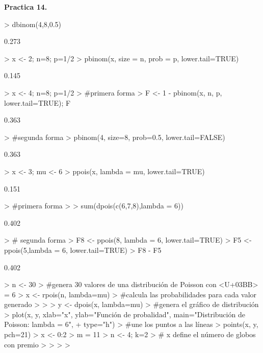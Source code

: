 \documentclass{article}
\begin{document}
\textbf{Practica 14.}

\begin{Schunk}
\begin{Sinput}
> dbinom(4,8,0.5)
\end{Sinput}
\begin{Soutput}
[1] 0.273
\end{Soutput}
\begin{Sinput}
> x <- 2; n=8; p=1/2
> pbinom(x, size = n, prob = p, lower.tail=TRUE)
\end{Sinput}
\begin{Soutput}
[1] 0.145
\end{Soutput}
\begin{Sinput}
> x <- 4; n=8; p=1/2
> #primera forma
> F <- 1 - pbinom(x, n, p, lower.tail=TRUE); F
\end{Sinput}
\begin{Soutput}
[1] 0.363
\end{Soutput}
\begin{Sinput}
> #segunda forma
> pbinom(4, size=8, prob=0.5, lower.tail=FALSE)
\end{Sinput}
\begin{Soutput}
[1] 0.363
\end{Soutput}
\begin{Sinput}
> x <- 3; mu <- 6
> ppois(x, lambda = mu, lower.tail=TRUE)
\end{Sinput}
\begin{Soutput}
[1] 0.151
\end{Soutput}
\begin{Sinput}
> #primera forma
> 
> sum(dpois(c(6,7,8),lambda = 6))
\end{Sinput}
\begin{Soutput}
[1] 0.402
\end{Soutput}
\begin{Sinput}
> # segunda forma
> F8 <- ppois(8, lambda = 6, lower.tail=TRUE)
> F5 <- ppois(5,lambda = 6, lower.tail=TRUE)
> F8 - F5
\end{Sinput}
\begin{Soutput}
[1] 0.402
\end{Soutput}
\begin{Sinput}
> n <- 30
> #genera 30 valores de una distribución de Poisson con <U+03BB> = 6
> x <- rpois(n, lambda=mu)
> #calcula las probabilidades para cada valor generado
> 
> 
> y <- dpois(x, lambda=mu)
> #genera el gráfico de distribución
> plot(x, y, xlab="x", ylab="Función de probalidad", main="Distribución de Poisson: lambda = 6",
+ type="h")
> #une los puntos a las líneas
> points(x, y, pch=21)
> x <- 0:2 
> m = 11
> n <- 4; k=2
> # x define el número de globos con premio
> 
> 
> 
> 
\end{Sinput}
\end{Schunk}
\end{document}
